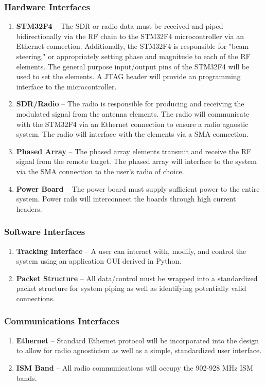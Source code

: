 \documentclass[ProductRequirements.tex]{subfiles}
\begin{document}
		\subsubsection{Hardware Interfaces}
			\begin{enumerate}\itemsep1pt
				\item \textbf{STM32F4} -- The SDR or radio data must be received and piped bidirectionally via the RF chain to the STM32F4 microcontroller via an Ethernet connection.  Additionally, the STM32F4 is responsible for "beam steering," or appropriately setting phase and magnitude to each of the RF elements.  The general purpose input/output pins of the STM32F4 will be used to set the elements. A JTAG header will provide an programming interface to the microcontroller.
				\item \textbf{SDR/Radio} -- The radio is responsible for producing and receiving the modulated signal from the antenna elements.  The radio will communicate with the STM32F4 via an Ethernet connection to ensure a radio agnostic system.  The radio will interface with the elements via a SMA connection.  
				\item \textbf{Phased Array} -- The phased array elements transmit and receive the RF signal from the remote target.  The phased array will interface to the system via the SMA connection to the user's radio of choice.
				\item \textbf{Power Board} -- The power board must supply sufficient power to the entire system.  Power rails will interconnect the boards through high current headers.
			\end{enumerate}
			
		\subsubsection{Software Interfaces}
			\begin{enumerate}\itemsep1pt
				\item \textbf{Tracking Interface} -- A user can interact with, modify, and control the system using an application GUI derived in Python.
				\item \textbf{Packet Structure} -- All data/control must be wrapped into a standardized packet structure for system piping as well as identifying potentially valid connections.
			\end{enumerate}
			
		\subsubsection{Communications Interfaces}
			\begin{enumerate}\itemsep1pt
				\item \textbf{Ethernet} -- Standard Ethernet protocol will be incorporated into the design to allow for radio agnosticism as well as a simple, standardized user interface.
				\item \textbf{ISM Band} -- All radio communications will occupy the 902-928 MHz ISM bands.
			\end{enumerate}
			
\end{document}

